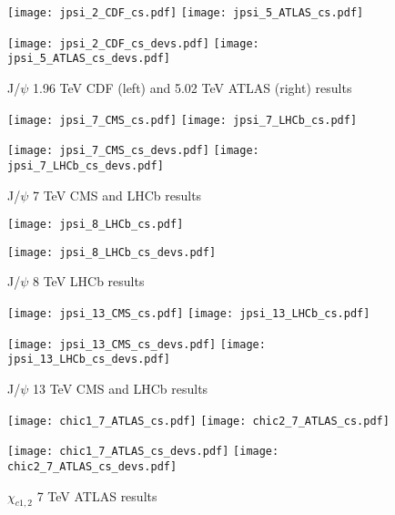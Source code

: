 \documentclass{article}
\begin{document}

\begin{figure}
\centering
\texttt{[image: jpsi\_2\_CDF\_cs.pdf]}
\texttt{[image: jpsi\_5\_ATLAS\_cs.pdf]}

\texttt{[image: jpsi\_2\_CDF\_cs\_devs.pdf]}
\texttt{[image: jpsi\_5\_ATLAS\_cs\_devs.pdf]}
\caption{J/$\psi$ 1.96 TeV CDF (left) and 5.02 TeV ATLAS (right) results}
\end{figure}

\clearpage

\begin{figure}
\centering
\texttt{[image: jpsi\_7\_CMS\_cs.pdf]}
\texttt{[image: jpsi\_7\_LHCb\_cs.pdf]}

\texttt{[image: jpsi\_7\_CMS\_cs\_devs.pdf]}
\texttt{[image: jpsi\_7\_LHCb\_cs\_devs.pdf]}
\caption{J/$\psi$ 7 TeV CMS and LHCb results}
\end{figure}

\clearpage

\begin{figure}
\centering
\texttt{[image: jpsi\_8\_LHCb\_cs.pdf]}

\texttt{[image: jpsi\_8\_LHCb\_cs\_devs.pdf]}
\caption{J/$\psi$ 8 TeV LHCb results}
\end{figure}

\clearpage

\begin{figure}
\centering
\texttt{[image: jpsi\_13\_CMS\_cs.pdf]}
\texttt{[image: jpsi\_13\_LHCb\_cs.pdf]}

\texttt{[image: jpsi\_13\_CMS\_cs\_devs.pdf]}
\texttt{[image: jpsi\_13\_LHCb\_cs\_devs.pdf]}
\caption{J/$\psi$ 13 TeV CMS and LHCb results}
\end{figure}

\clearpage

\begin{figure}
\centering
\texttt{[image: chic1\_7\_ATLAS\_cs.pdf]}
\texttt{[image: chic2\_7\_ATLAS\_cs.pdf]}

\texttt{[image: chic1\_7\_ATLAS\_cs\_devs.pdf]}
\texttt{[image: chic2\_7\_ATLAS\_cs\_devs.pdf]}
\caption{$\chi_{c1,2}$ 7 TeV ATLAS results}
\end{figure}
\end{document}
